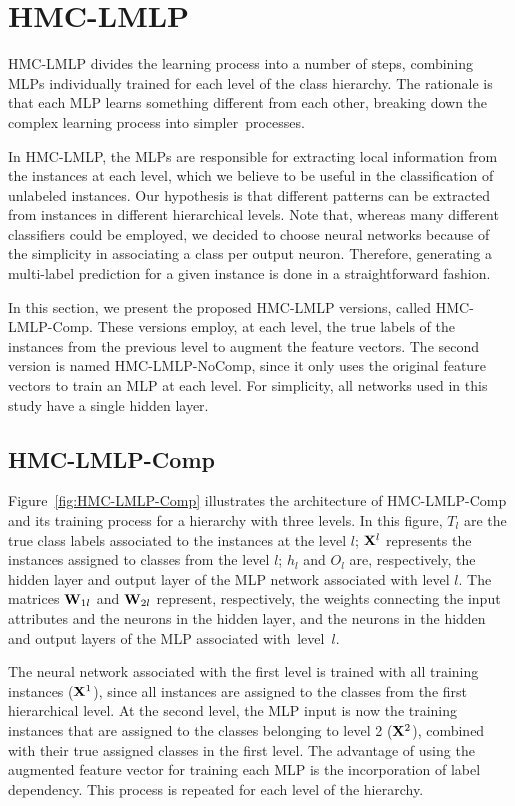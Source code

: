 \section{HMC-LMLP}\label{sec:HMC-LMLP}

HMC-LMLP divides the learning process into a number of steps, combining MLPs individually trained for each level of the class hierarchy. The rationale is that each MLP learns something different from each other, breaking down the complex learning process into simpler~processes.

In HMC-LMLP, the MLPs are responsible for extracting local information from the instances at each level, which we believe to be useful in the classification of unlabeled instances. Our hypothesis is that different patterns can be extracted from instances in different hierarchical levels. Note that, whereas many different classifiers could be employed, we decided to choose neural networks because of the simplicity in associating a class per output neuron. Therefore, generating a multi-label prediction for a given instance is done in a straightforward fashion.

In this section, we present the proposed HMC-LMLP versions, called HMC-LMLP-Comp. These versions employ, at each level, the true labels of the instances from the previous level to augment the feature vectors. The second version is named HMC-LMLP-NoComp, since it only uses the original feature vectors to train an MLP at each level. For simplicity, all networks used in this study have a single hidden layer.

\subsection{HMC-LMLP-Comp}

Figure~\ref{fig:HMC-LMLP-Comp} illustrates the architecture of HMC-LMLP-Comp and its training process for a hierarchy with three levels. In this figure, $T_l$ are the true class labels associated to the instances at the level $l$; ${\bf X}^l$ represents the instances assigned to classes from the level $l$; $h_l$ and $O_l$ are, respectively, the hidden layer and output layer of the MLP network associated with level $l$. The matrices ${\bf W}_{1l}$ and ${\bf W}_{2l}$ represent, respectively, the weights connecting the input attributes and the neurons in the hidden layer, and the neurons in the hidden and output layers of the MLP associated with~level~$l$.

The neural network associated with the first level is trained with all training instances (${\bf X}^1$), since all instances are assigned to the classes from the first hierarchical level. At the second level, the MLP input is now the training instances that are assigned to the classes belonging to level 2 (${\bf X}^2$), combined with their true assigned classes in the first level. The advantage of using the augmented feature vector for training each MLP is the incorporation of label dependency. This process is repeated for each level of the hierarchy.

